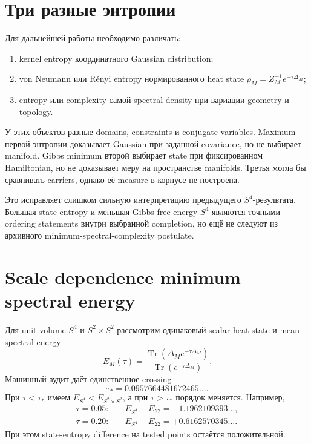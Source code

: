 \section{Три разные энтропии}

Для дальнейшей работы необходимо различать:
\begin{enumerate}
 \item kernel entropy координатного Gaussian distribution;
 \item von Neumann или R\'enyi entropy нормированного heat state
 \(\rho_M=Z_M^{-1}e^{-\tau\Delta_M}\);
 \item entropy или complexity самой spectral density при вариации geometry
 и topology.
\end{enumerate}
У этих объектов разные domains, constraints и conjugate variables.
Maximum первой энтропии доказывает Gaussian при заданной covariance, но не
выбирает manifold. Gibbs minimum второй выбирает state при фиксированном
Hamiltonian, но не доказывает меру на пространстве manifolds. Третья могла
бы сравнивать carriers, однако её measure в корпусе не построена.

Это исправляет слишком сильную интерпретацию предыдущего
\(S^4\)-результата. Большая state entropy и меньшая Gibbs free energy
\(S^4\) являются точными ordering statements внутри выбранной completion,
но ещё не следуют из архивного minimum-spectral-complexity postulate.

\section{Scale dependence minimum spectral energy}

Для unit-volume \(S^4\) и \(S^2\times S^2\) рассмотрим одинаковый scalar
heat state и mean spectral energy
\begin{equation}
 E_M(\tau)
 =\frac{\operatorname{Tr}(\Delta_Me^{-\tau\Delta_M})}
 {\operatorname{Tr}(e^{-\tau\Delta_M})}.
\end{equation}
Машинный аудит даёт единственное crossing
\begin{equation}
 \tau_*=0.0957664481672465\ldots.
\end{equation}
При \(\tau<\tau_*\) имеем \(E_{S^4}<E_{S^2\times S^2}\), а при
\(\tau>\tau_*\) порядок меняется. Например,
\begin{equation}
 \begin{aligned}
 \tau=0.05:&\quad E_{S^4}-E_{22}=-1.1962109393\ldots,\\
 \tau=0.20:&\quad E_{S^4}-E_{22}=+0.6162570345\ldots.
 \end{aligned}
\end{equation}
При этом state-entropy difference на tested points остаётся положительной.

